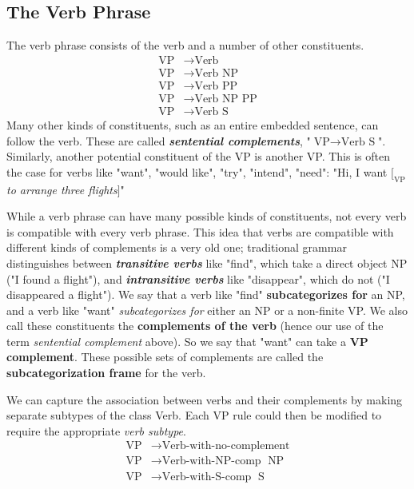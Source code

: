 \documentclass[11pt]{article}
\begin{document}
\subsection{The Verb Phrase}
The verb phrase consists of the verb and a number of other constituents. 
\begin{align*}
\text{VP} &\rightarrow \text{Verb}\\
\text{VP} &\rightarrow \text{Verb}\,\,\text{NP}\\
\text{VP} &\rightarrow \text{Verb}\,\,\text{PP}\\
\text{VP} &\rightarrow \text{Verb}\,\,\text{NP}\,\,\text{PP} \\
\text{VP} &\rightarrow \text{Verb}\,\,\text{S}
\end{align*}
Many other kinds of constituents, such as an entire embedded sentence, can follow the verb. These are called \emph{\textbf{sentential complements}}, "$\text{VP} \rightarrow \text{Verb}\,\,\text{S}$".  Similarly, another potential constituent of the VP is another VP. This is often the case for verbs like "want", "would like", "try", "intend", "need": "Hi, I want $[_{\text{VP}}$ \emph{to arrange three flights}$]$"

While a verb phrase can have many possible kinds of constituents, not every verb is compatible with every verb phrase. This idea that verbs are compatible with different kinds of complements is a very old one; traditional grammar distinguishes between \emph{\textbf{transitive verbs}} like "find", which  take a direct object NP ("I found a flight"), and \textbf{\emph{intransitive verbs}} like "disappear", which do not ("I disappeared a flight"). We say that a verb like "find" \textbf{subcategorizes for} an NP, and a verb like "want" \emph{subcategorizes for} either an NP or a non-finite VP. We also call these constituents the \textbf{complements of the verb} (hence our use of the term \emph{sentential complement} above). So we say that "want" can take a \textbf{VP complement}. These possible sets of complements are called the \textbf{subcategorization frame} for the verb.

We can capture the association between verbs and their complements by making separate subtypes of the class Verb. Each VP rule could then be modified to require the appropriate \emph{verb subtype}. 
\begin{align*}
\text{VP} &\rightarrow \text{Verb-with-no-complement}\\
\text{VP} &\rightarrow \text{Verb-with-NP-comp}\;\,\,\text{NP}\\
\text{VP} &\rightarrow \text{Verb-with-S-comp}\;\,\,\text{S}
\end{align*}
\end{document}
